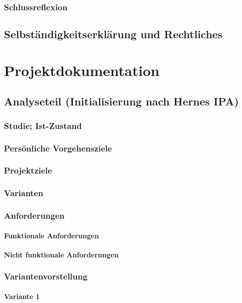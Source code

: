 \documentclass{report}
\begin{document}
\section{Schlussreflexion}

\chapter{Selbständigkeitserklärung und Rechtliches}

\part{Projektdokumentation}

\chapter{Analyseteil (Initialisierung nach Hernes IPA)}
\section{Studie; Ist-Zustand}
\section{Persönliche Vorgehensziele}
\section{Projektziele}
\section{Varianten}
\section{Anforderungen}
\subsection{Funktionale Anforderungen}
\subsection{Nicht funktionale Anforderungen}
\section{Variantenvorstellung}
\subsection{Variante 1}
\end{document}
